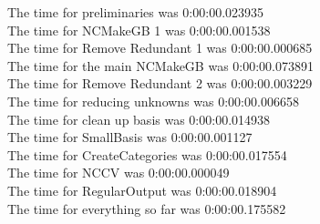 \documentclass[rep10,leqno]{report}
\begin{document}
\noindent
The time for preliminaries was 0:00:00.023935\\
The time for NCMakeGB 1 was 0:00:00.001538\\
The time for Remove Redundant 1 was 0:00:00.000685\\
The time for the main NCMakeGB was 0:00:00.073891\\
The time for Remove Redundant 2 was 0:00:00.003229\\
The time for reducing unknowns was 0:00:00.006658\\
The time for clean up basis was 0:00:00.014938\\
The time for SmallBasis was 0:00:00.001127\\
The time for CreateCategories was 0:00:00.017554\\
The time for NCCV was 0:00:00.000049\\
The time for RegularOutput was 0:00:00.018904\\
The time for everything so far was 0:00:00.175582\\
\end{document}
